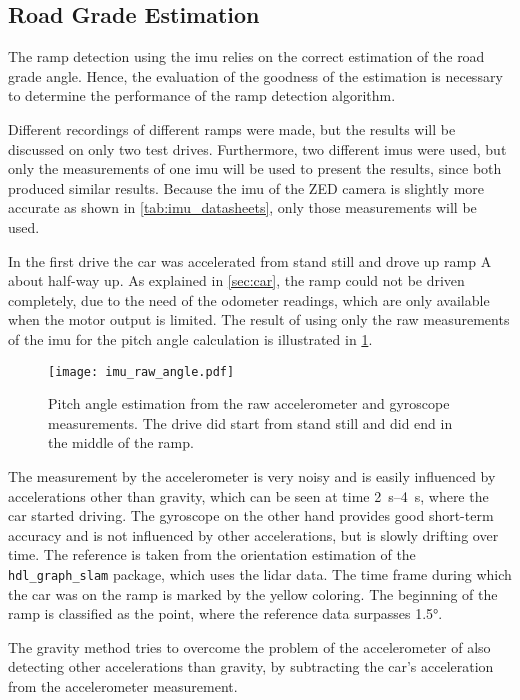 \subsection{Road Grade Estimation}
The ramp detection using the \gls{imu} relies on the correct estimation of the road grade angle.
Hence, the evaluation of the goodness of the estimation is necessary to determine the performance of the ramp detection algorithm.\par
Different recordings of different ramps were made, but the results will be discussed on only two test drives.
Furthermore, two different \glspl{imu} were used, but only the measurements of one \gls{imu} will be used to present the results, since both produced similar results.
Because the \gls{imu} of the ZED camera is slightly more accurate as shown in \cref{tab:imu_datasheets}, only those measurements will be used.\par
In the first drive the car was accelerated from stand still and drove up ramp A about half-way up.
As explained in \cref{sec:car}, the ramp could not be driven completely, due to the need of the odometer readings, which are only available when the motor output is limited.
The result of using only the raw measurements of the \gls{imu} for the pitch angle calculation is illustrated in \cref{fig:imu_raw_angle}.
\begin{figure}[htb]
    \centering
    \texttt{[image: imu\_raw\_angle.pdf]}
    \caption[Angle estimation using raw measurements]{Pitch angle estimation from the raw accelerometer and gyroscope measurements. The drive did start from stand still and did end in the middle of the ramp.}
    \label{fig:imu_raw_angle}
\end{figure}
The measurement by the accelerometer is very noisy and is easily influenced by accelerations other than gravity, which can be seen at time \SIrange{2}{4}{\second}, where the car started driving.
The gyroscope on the other hand provides good short-term accuracy and is not influenced by other accelerations, but is slowly drifting over time.
The reference is taken from the orientation estimation of the \texttt{hdl\_graph\_slam} package, which uses the \gls{lidar} data.
The time frame during which the car was on the ramp is marked by the yellow coloring.
The beginning of the ramp is classified as the point, where the reference data surpasses \ang{1.5}.\par
The gravity method tries to overcome the problem of the accelerometer of also detecting other accelerations than gravity, by subtracting the car's acceleration from the accelerometer measurement.
